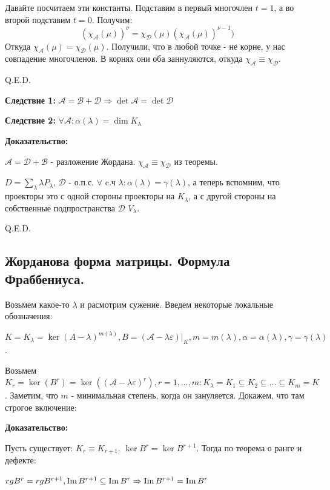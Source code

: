 Давайте посчитаем эти константы. Подставим в первый многочлен $t=1$, а во второй подставим $t=0$. Получим:
$$(\chi_{\mathcal{A}}(\mu))^{\nu} = \chi_{\mathcal{D}}(\mu) (\chi_{\mathcal{A}}(\mu))^{\nu-1})$$
Откуда $\chi_{\mathcal{A}}(\mu)=\chi_{\mathcal{D}}(\mu)$. Получили, что в любой точке - не корне, у нас совпадение многочленов. В корнях они оба заннуляются, откуда $\chi_{\mathcal{A}} \equiv \chi_{\mathcal{D}}$.

\hfill Q.E.D.

\textbf{Следствие 1:} $\mathcal{A} = \mathcal{B} + \mathcal{D} \Rightarrow \det \mathcal{A} =\det \mathcal{D} $

\textbf{Следствие 2:} $\forall \mathcal{A} :\alpha(\lambda) = \dim K_{\lambda}$

\textbf{Доказательство:}

$\mathcal{A} = \mathcal{D} + \mathcal{B}$ - разложение Жордана. $\chi_{\mathcal{A}}\equiv \chi_{\mathcal{D}}$ из теоремы.

$D = \sum\limits_{\lambda}\lambda P_{\lambda}$, $\mathcal{D}$ - о.п.с. $\forall $ c.ч $\lambda: \alpha(\lambda) = \gamma(\lambda)$, а теперь вспомним, что проекторы это с одной стороны проекторы на $K_{\lambda}$, а с другой стороны на собственные подпространства $\mathcal{D}$ $V_{\lambda}$.

\hfill Q.E.D.

\pagebreak

\subsection{Жорданова форма матрицы. Формула Фраббениуса. }

Возьмем какое-то $\lambda$ и расмотрим сужение. Введем некоторые локальные обозначения:

$K=K_{\lambda} = \ker (A-\lambda)^{m(\lambda)},B = (\mathcal{A}-\lambda\varepsilon)\Big|_{K},m = m(\lambda),\alpha= \alpha(\lambda),\gamma=\gamma(\lambda)$.

Возьмем $K_r = \ker(B^r) = \ker((\mathcal{A}-\lambda\varepsilon)^r),r= 1,\ldots, m: K_\lambda = K_1 \subseteq K_2 \subseteq\ldots \subseteq K_m = K $. Заметим, что $m$ - минимальная степень, когда он зануляется. Докажем, что там строгое включение:

\textbf{Доказательство:}

Пусть существует: $K_r \equiv K_{r+1}$. $\ker B^r = \ker B^{r+1}$. Тогда по теорема о ранге и дефекте: 

$rg B^r = rg B^{r+1}, \operatorname{Im} B^{r+1} \subseteq \operatorname{Im} B^r\Rightarrow \operatorname{Im} B^{r+1} =\operatorname{Im} B^r $

